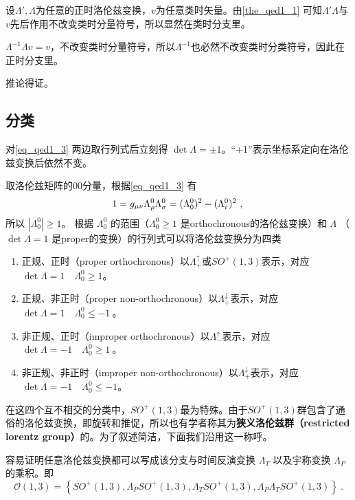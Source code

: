 设$\Lambda',\Lambda$为任意的正时洛伦兹变换，$v$为任意类时矢量。由\autoref{the_qed1_1} 可知$\Lambda'\Lambda$与$v$先后作用不改变类时分量符号，所以显然在类时分支里。

$\Lambda^{-1}\Lambda v=v$，不改变类时分量符号，所以$\Lambda^{-1}$也必然不改变类时分类符号，因此在正时分支里。

推论得证。
\subsection{分类}
对\autoref{eq_qed1_3} 两边取行列式后立刻得 $\det \Lambda=\pm1$。“+1”表示坐标系定向在洛伦兹变换后依然不变。%

取洛伦兹矩阵的00分量，根据\autoref{eq_qed1_3} 有
\begin{equation}
1=g_{\mu \nu} \Lambda_{\rho}^{0} \Lambda_{\sigma}^{0}= (\Lambda_{0}^{0})^2- (\Lambda_{i}^{0})^2~,\\
\end{equation}
所以 $\left|\Lambda_{0}^{0} \right|\geqslant1$。 根据 $\Lambda_{0}^{0}$ 的范围（$\Lambda_{0}^{0}\geqslant1$ 是orthochronous的洛伦兹变换）和 $\Lambda$ （$\det\Lambda=1$ 是proper的变换）的行列式可以将洛伦兹变换分为四类
\begin{enumerate}
\item 正规、正时（proper orthochronous）以$\Lambda_{+}^{\uparrow}$或$SO^+(1,3)$表示，对应 $\det\Lambda=1\quad \Lambda_{0}^{0}\geqslant1$。
\item 正规、非正时（proper non-orthochronous）以$\Lambda_{+}^{\downarrow}$表示，对应 $\det\Lambda=1\quad \Lambda_{0}^{0}\leqslant-1~$。
\item 非正规、正时（improper orthochronous）以$\Lambda_{-}^{\uparrow}$表示，对应 $\det\Lambda=-1 \quad\Lambda_{0}^{0}\geqslant1~$。
\item 非正规、非正时（improper non-orthochronous）以$\Lambda_{+}^{\downarrow}$表示，对应 $\det\Lambda=-1 \quad\Lambda_{0}^{0}\leqslant-1$。
\end{enumerate}

在这四个互不相交的分类中，$SO^+(1,3)$最为特殊。由于$SO^+(1,3)$群包含了通俗的洛伦兹变换，即旋转和推促，所以也有学者称其为\textbf{狭义洛伦兹群（restricted lorentz group）}的。为了叙述简洁，下面我们沿用这一称呼。

容易证明任意洛伦兹变换都可以写成该分支与时间反演变换 $ \Lambda_{T}$ 以及宇称变换 $\Lambda_{P}$ 的乘积。即
\begin{equation}\label{eq_qed1_4}
\mathcal{O}(1,3)=\left\{SO^+(1,3), \Lambda_{P} SO^+(1,3), \Lambda_{T} SO^+(1,3), \Lambda_{P} \Lambda_{T} SO^+(1,3)\right\}~.
\end{equation}


